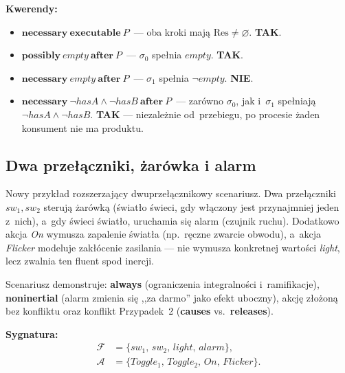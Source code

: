 \documentclass[11pt,a4paper]{article}
\newif\ifshowbib
\newcommand{\bibonly}[1]{\ifshowbib#1\fi}
\renewcommand{\cite}[2][]{\unskip}%
\newcommand{\causes}{\textbf{causes}}
\newcommand{\aft}{\textbf{after}}
\newcommand{\always}{\textbf{always}}
\newcommand{\releases}{\textbf{releases}}
\newcommand{\noninertial}{\textbf{noninertial}}
\newcommand{\necessary}{\textbf{necessary}}
\newcommand{\possibly}{\textbf{possibly}}
\newcommand{\executable}{\textbf{executable}}
\theoremstyle{definition}
\begin{document}
\medskip
\noindent\textbf{Kwerendy:}
\begin{itemize}
  \item $\necessary\ \executable\ P$~---
    oba kroki mają $\mathrm{Res} \neq \varnothing$. \textbf{TAK}.

  \item $\possibly\ \mathit{empty}\ \aft\ P$~---
    $\sigma_0$ spełnia $\mathit{empty}$. \textbf{TAK}.

  \item $\necessary\ \mathit{empty}\ \aft\ P$~---
    $\sigma_1$ spełnia $\neg\mathit{empty}$. \textbf{NIE}.

  \item $\necessary\ \neg\mathit{hasA} \land \neg\mathit{hasB}\ \aft\ P$~---
    zarówno $\sigma_0$, jak i~$\sigma_1$ spełniają $\neg\mathit{hasA} \land \neg\mathit{hasB}$.
    \textbf{TAK} --- niezależnie od~przebiegu, po procesie żaden konsument
    nie ma produktu.
\end{itemize}

\subsection{Dwa przełączniki, żarówka i alarm}

\noindent Nowy przykład rozszerzający dwuprzełącznikowy scenariusz\bibonly{ z~\cite{rw02}}.
Dwa przełączniki $\mathit{sw_1}, \mathit{sw_2}$ sterują żarówką (światło świeci,
gdy włączony jest przynajmniej jeden z~nich), a~gdy świeci światło, uruchamia
się alarm (czujnik ruchu). Dodatkowo akcja \textit{On} wymusza zapalenie
światła (np.\ ręczne zwarcie obwodu), a~akcja \textit{Flicker} modeluje
zakłócenie zasilania --- nie wymusza konkretnej wartości \textit{light},
lecz zwalnia ten fluent spod inercji.

Scenariusz demonstruje: \always{} (ograniczenia integralności i~ramifikacje),
\noninertial{} (alarm zmienia się ,,za darmo'' jako efekt uboczny),
akcję złożoną bez konfliktu oraz konflikt Przypadek~2 (\causes{} vs.\ \releases{}).

\medskip
\noindent\textbf{Sygnatura:}
\begin{align*}
  \mathcal{F} &= \{\mathit{sw_1},\, \mathit{sw_2},\, \mathit{light},\, \mathit{alarm}\}, \\
  \mathcal{A} &= \{\mathit{Toggle_1},\, \mathit{Toggle_2},\, \mathit{On},\, \mathit{Flicker}\}.
\end{align*}
\end{document}
